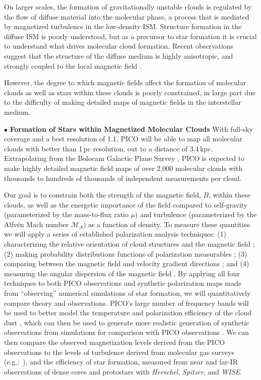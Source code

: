 \documentclass[PICOReport.tex]{subfiles}
\begin{document}
On larger scales, the formation of gravitationally unstable clouds is regulated by the flow of diffuse material into the molecular phase, a process that is mediated by magnetized turbulence in the low-density ISM. Structure formation in the diffuse ISM is poorly understood, but as a precursor to star formation it is crucial to understand what drives molecular cloud formation. Recent observations suggest that the structure of the diffuse medium is highly anisotropic, and strongly coupled to the local magnetic field \citep{Clark:2014, Clark:2015, Kalberla:2016, KalberlaKerp:2016}.

However, the degree to which magnetic fields affect the formation of molecular clouds as well as stars within these clouds is poorly constrained, in large part due to the difficulty of making detailed maps of magnetic fields in the interstellar medium.

\noindent$\bullet$ {\bf Formation of Stars within Magnetized Molecular Clouds} \hspace{0.1in}
With full-sky coverage and a best resolution of 1.1\arcmin, PICO will be able to map all molecular clouds with better than 1\,pc resolution, out to a distance of 3.4\,kpc.  Extrapolating from the Bolocam Galactic Plane Survey \citep[BGPS,][]{EllsworthBowers2015}, PICO is expected 
to make highly detailed magnetic field maps of over 2,000 molecular clouds with thousands to hundreds of thousands of independent measurements per cloud. 

Our goal is to constrain both the strength of the magnetic field, $B$, within these clouds, as well as the energetic importance of the field compared to self-gravity (parameterized by the mass-to-flux ratio $\mu$) and turbulence (parameterized by the Alfv\'{e}n Mach number $\mathcal{M}_A$) as a function of density.
To measure these quantities we will apply a series of established polarization analysis techniques:
(1) characterizing the relative orientation of cloud structures and the magnetic field \citep{Soler2013,Chen2016,Soler2017,Planck:XXXV}; (2) making probability distributions functions of polarization measurables \citep{Fissel2016, King2018}; (3) comparing between the magnetic field and velocity gradient directions \citep{GonzalezCasanova2017,Yuen2017,Lazarian2018}; and (4) measuring the angular dispersion of the magnetic field  \citep{Davis1951,Chandrasekhar1953, Hildebrand2009,Houde2009}.
By applying all four techniques to both PICO observations and synthetic polarization maps made from ``observing'' numerical simulations of star formation, we will quantitatively compare theory and observations. PICO's large number of frequency bands will be used to better model the temperature and polarization efficiency of the cloud dust  \citep{Andersson2015}, which can then be used to generate more realistic generation of synthetic observations from simulations for comparison with PICO observations \citep{Seifried2018}. We can then compare the observed magnetization levels derived from the PICO observations to the levels of turbulence derived from molecular gas surveys (e.g.:~\citealt{EllsworthBowers2015, Miville-Deschenes2017}), and the efficiency of star formation, measured from near and far-IR observations of dense cores and protostars with {\em Herschel}, {\em Spitzer}, and {\em WISE}. 
\end{document}
